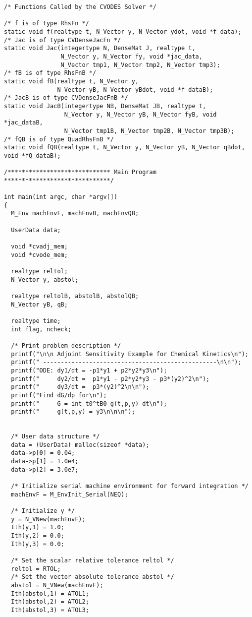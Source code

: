 \begin{verbatim}
/* Functions Called by the CVODES Solver */

/* f is of type RhsFn */
static void f(realtype t, N_Vector y, N_Vector ydot, void *f_data);
/* Jac is of type CVDenseJacFn */
static void Jac(integertype N, DenseMat J, realtype t,
                N_Vector y, N_Vector fy, void *jac_data, 
                N_Vector tmp1, N_Vector tmp2, N_Vector tmp3);
/* fB is of type RhsFnB */
static void fB(realtype t, N_Vector y, 
               N_Vector yB, N_Vector yBdot, void *f_dataB);
/* JacB is of type CVDenseJacFnB */
static void JacB(integertype NB, DenseMat JB, realtype t,
                 N_Vector y, N_Vector yB, N_Vector fyB, void *jac_dataB,
                 N_Vector tmp1B, N_Vector tmp2B, N_Vector tmp3B);
/* fQB is of type QuadRhsFnB */
static void fQB(realtype t, N_Vector y, N_Vector yB, N_Vector qBdot, void *fQ_dataB);

/***************************** Main Program ******************************/

int main(int argc, char *argv[])
{
  M_Env machEnvF, machEnvB, machEnvQB;

  UserData data;

  void *cvadj_mem;
  void *cvode_mem;

  realtype reltol;
  N_Vector y, abstol;

  realtype reltolB, abstolB, abstolQB;
  N_Vector yB, qB;

  realtype time;
  int flag, ncheck;

  /* Print problem description */
  printf("\n\n Adjoint Sensitivity Example for Chemical Kinetics\n");
  printf(" -------------------------------------------------\n\n");
  printf("ODE: dy1/dt = -p1*y1 + p2*y2*y3\n");
  printf("     dy2/dt =  p1*y1 - p2*y2*y3 - p3*(y2)^2\n");
  printf("     dy3/dt =  p3*(y2)^2\n\n");
  printf("Find dG/dp for\n");
  printf("     G = int_t0^tB0 g(t,p,y) dt\n");
  printf("     g(t,p,y) = y3\n\n\n");


  /* User data structure */
  data = (UserData) malloc(sizeof *data);
  data->p[0] = 0.04;
  data->p[1] = 1.0e4;
  data->p[2] = 3.0e7;

  /* Initialize serial machine environment for forward integration */
  machEnvF = M_EnvInit_Serial(NEQ);

  /* Initialize y */
  y = N_VNew(machEnvF); 
  Ith(y,1) = 1.0;                
  Ith(y,2) = 0.0;
  Ith(y,3) = 0.0;

  /* Set the scalar relative tolerance reltol */
  reltol = RTOL;               
  /* Set the vector absolute tolerance abstol */
  abstol = N_VNew(machEnvF); 
  Ith(abstol,1) = ATOL1;       
  Ith(abstol,2) = ATOL2;
  Ith(abstol,3) = ATOL3;


\end{verbatim}
